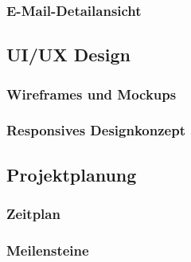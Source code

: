 \documentclass[11pt,a4paper]{article}
\begin{document}
\subsubsection{E-Mail-Detailansicht}

\subsection{UI/UX Design}

\subsubsection{Wireframes und Mockups}

\subsubsection{Responsives Designkonzept}

\subsection{Projektplanung}

\subsubsection{Zeitplan}

\subsubsection{Meilensteine}
\end{document}
